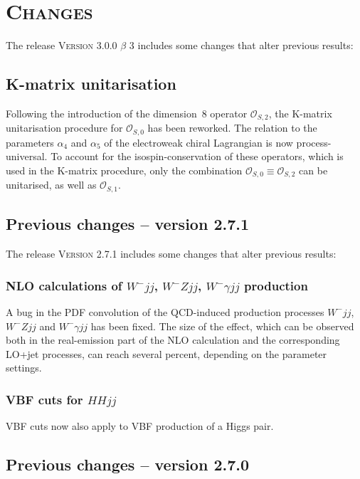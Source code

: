 \documentclass[english,12pt]{article}
\begin{document}
\newpage

\section{\textsc{Changes}}

The release \textsc{Version 3.0.0 $\beta$ 3} includes some changes that alter previous results:

\subsection{K-matrix unitarisation}

Following the introduction of the dimension~8 operator $\mathcal{O}_{S,2}$, the
K-matrix unitarisation procedure for $\mathcal{O}_{S,0}$ has been reworked.
The relation to the parameters $\alpha_4$ and $\alpha_5$ of the electroweak
chiral Lagrangian is now process-universal. To account for the
isospin-conservation of these operators, which is used in the K-matrix
procedure, only the combination $\mathcal{O}_{S,0}\equiv\mathcal{O}_{S,2}$ can
be unitarised, as well as $\mathcal{O}_{S,1}$.


\subsection{Previous changes -- version 2.7.1}

The release \textsc{Version 2.7.1} includes some changes that alter previous results:


\subsubsection{NLO calculations of $W^-jj$, $W^-Zjj$, $W^-\gamma jj$ production}

A bug in the PDF convolution of the QCD-induced production processes $W^-jj$,
$W^-Zjj$ and $W^-\gamma jj$ has been fixed. The size of the effect,
which can be observed both in the real-emission part of the NLO
calculation and the corresponding LO+jet processes, can reach several
percent, depending on the parameter settings.


\subsubsection{VBF cuts for $HHjj$}

VBF cuts now also apply to VBF production of a Higgs pair.


\subsection{Previous changes -- version 2.7.0}
\end{document}
